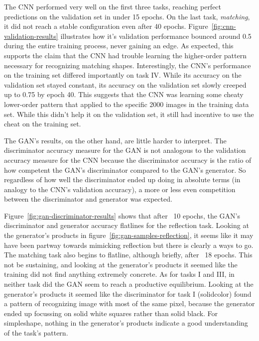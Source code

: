 \documentclass{article}
\renewcommand{\it}{\textit}
\begin{document}
The CNN performed very well on the first three tasks, reaching perfect predictions on the validation set in under 15 epochs.
On the last task, \it{matching}, it did not reach a stable configuration even after 40 epochs.
Figure~\ref{fig:cnn-validation-results} illustrates how it's validation performance bounced around 0.5 during the entire training process, never gaining an edge.
As expected, this supports the claim that the CNN had trouble learning the higher-order pattern necessary for recognizing matching shapes.
Interestingly, the CNN's performance on the training set differed importantly on task IV.
While its accuracy on the validation set stayed constant, its accuracy on the validation set slowly creeped up to 0.75 by epoch 40.
This suggests that the CNN was learning some cheaty lower-order pattern that applied to the specific 2000 images in the training data set.
While this didn't help it on the validation set, it still had incentive to use the cheat on the training set.

The GAN's results, on the other hand, are little harder to interpret.
The discriminator accuracy measure for the GAN is not analogous to the validation accuracy measure for the CNN because the discriminator accuracy is the ratio of how competent the GAN's discriminator compared to the GAN's generator.
So regardless of how well the discriminator ended up doing in absolute terms (in analogy to the CNN's validation accuracy), a more or less even competition between the discriminator and generator was expected.

Figure~\ref{fig:gan-discriminator-results} shows that after ~10 epochs, the GAN's discriminator and generator accuracy flatlines for the reflection task. Looking at the generator's products in figure~\ref{fig:gan-samples-reflection}, it seems like it may have been partway towards mimicking reflection but there is clearly a ways to go.
The matching task also begins to flatline, although briefly, after ~18 epochs.
This not be sustaining, and looking at the generator's products it seemed like the training did not find anything extremely concrete.
As for tasks I and III, in neither task did the GAN seem to reach a productive equilibrium.
Looking at the generator's products it seemed like the discriminator for task I (solidcolor) found a pattern of recognizing image with most of the same pixel, because the generator ended up focussing on solid white squares rather than solid black.
For simpleshape, nothing in the generator's products indicate a good understanding of the task's pattern.
\end{document}
